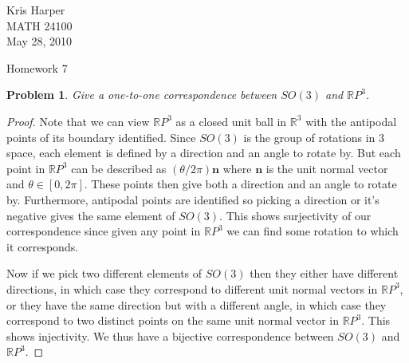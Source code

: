 \documentclass{article}
\newtheorem{problem}{Problem}
\begin{document}
\begin{flushright}
Kris Harper\\

MATH 24100\\

May 28, 2010
\end{flushright}

\begin{center}
Homework 7
\end{center}

\begin{problem}
Give a one-to-one correspondence between $SO(3)$ and $\mathbb{R}P^3$.
\end{problem}
\begin{proof}
Note that we can view $\mathbb{R}P^3$ as a closed unit ball in $\mathbb{R}^3$ with the antipodal points of its boundary identified. Since $SO(3)$ is the group of rotations in $3$ space, each element is defined by a direction and an angle to rotate by. But each point in $\mathbb{R}P^3$ can be described as $(\theta/2 \pi) \mathbf{n}$ where $\mathbf{n}$ is the unit normal vector and $\theta \in [0, 2 \pi]$. These points then give both a direction and an angle to rotate by. Furthermore, antipodal points are identified so picking a direction or it's negative gives the same element of $SO(3)$. This shows surjectivity of our correspondence since given any point in $\mathbb{R}P^3$ we can find some rotation to which it corresponds.

Now if we pick two different elements of $SO(3)$ then they either have different directions, in which case they correspond to different unit normal vectors in $\mathbb{R}P^3$, or they have the same direction but with a different angle, in which case they correspond to two distinct points on the same unit normal vector in $\mathbb{R}P^3$. This shows injectivity. We thus have a bijective correspondence between $SO(3)$ and $\mathbb{R}P^3$.
\end{proof}
\end{document}
